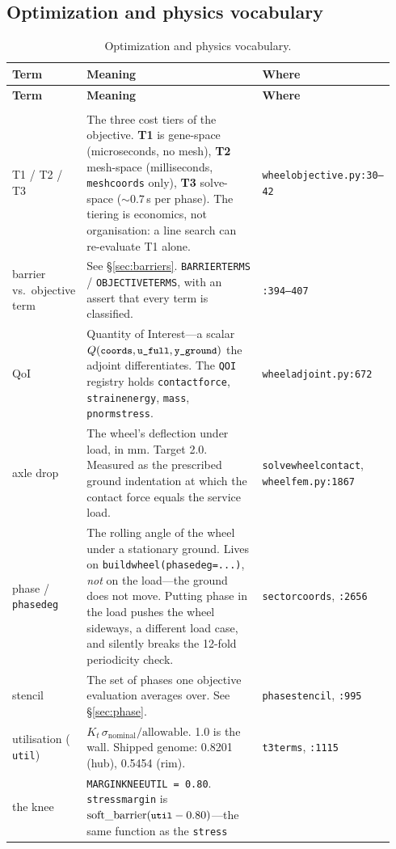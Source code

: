 \documentclass[11pt,a4paper]{article}
\makeatletter
\DeclareRobustCommand{\code}[1]{%
  \texttt{\small\def\_{\textunderscore\discretionary{}{}{}}#1}}
\newcommand{\at}[2]{\code{#1:#2}}
\newenvironment{termtable}[1]
  {\small\begin{longtable}{@{}>{\raggedright\arraybackslash}p{0.19\linewidth}
                             >{\raggedright\arraybackslash}p{0.54\linewidth}
                             >{\raggedright\arraybackslash}p{0.21\linewidth}@{}}
   \caption{#1}\\
   \toprule
   \textbf{Term} & \textbf{Meaning} & \textbf{Where} \\
   \midrule
   \endfirsthead
   \toprule
   \textbf{Term} & \textbf{Meaning} & \textbf{Where} \\
   \midrule
   \endhead
   \midrule
   \multicolumn{3}{r@{}}{\emph{continued on the next page}}\\
   \endfoot
   \bottomrule
   \endlastfoot}
  {\end{longtable}}
\makeatother
\begin{document}
\subsection{Optimization and physics vocabulary}

\begin{termtable}{Optimization and physics vocabulary.}
T1 / T2 / T3 &
  The three cost tiers of the objective. \textbf{T1} is gene-space
  (microseconds, no mesh), \textbf{T2} mesh-space (milliseconds,
  \code{mesh\_coords} only), \textbf{T3} solve-space ($\sim0.7$\,s per phase). The
  tiering is economics, not organisation: a line search can re-evaluate T1 alone. &
  \at{wheel\_objective.py}{30--42} \\
\addlinespace
barrier vs.\ objective term &
  See \S\ref{sec:barriers}. \code{BARRIER\_TERMS} / \code{OBJECTIVE\_TERMS}, with an
  assert that every term is classified. &
  \code{:394--407} \\
\addlinespace
QoI &
  Quantity of Interest---a scalar
  $Q(\code{coords}, \code{u\_full}, \code{y\_ground})$ the adjoint differentiates. The
  \code{QOI} registry holds \code{contact\_force}, \code{strain\_energy}, \code{mass},
  \code{pnorm\_stress}. &
  \at{wheel\_adjoint.py}{672} \\
\addlinespace
axle drop &
  The wheel's deflection under load, in mm. Target 2.0. Measured as the prescribed
  ground indentation at which the contact force equals the service load. &
  \code{solve\_wheel\_contact}, \at{wheel\_fem.py}{1867} \\
\addlinespace
phase / \code{phase\_deg} &
  The rolling angle of the wheel under a stationary ground. Lives on
  \code{build\_wheel(phase\_deg=...)}, \emph{not} on the load---the ground does not
  move. Putting phase in the load pushes the wheel sideways, a different load case, and
  silently breaks the 12-fold periodicity check. &
  \code{\_sector\_coords}, \code{:2656} \\
\addlinespace
stencil &
  The set of phases one objective evaluation averages over. See \S\ref{sec:phase}. &
  \code{phase\_stencil}, \code{:995} \\
\addlinespace
utilisation (\code{util}) &
  $K_t\,\sigma_{\text{nominal}} / \mathrm{allowable}$. 1.0 is the wall. Shipped genome:
  0.8201 (hub), 0.5454 (rim). &
  \code{t3\_terms}, \code{:1115} \\
\addlinespace
the knee &
  \code{MARGIN\_KNEE\_UTIL = 0.80}. \code{stress\_margin} is
  $\mathrm{soft\_barrier}(\code{util} - 0.80)$---the same function as the \code{stress}

\end{termtable}
\end{document}
